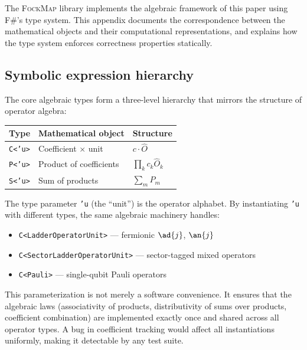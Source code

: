 %

The \textsc{FockMap} library implements the algebraic framework of this
paper using F\#'s type system.  This appendix documents the
correspondence between the mathematical objects and their
computational representations, and explains how the type system
enforces correctness properties statically.

\subsection*{Symbolic expression hierarchy}

The core algebraic types form a three-level hierarchy that mirrors the
structure of operator algebra:

\begin{center}
\begin{tabular}{@{}lll@{}}
\toprule
\textbf{Type} & \textbf{Mathematical object} & \textbf{Structure} \\
\midrule
\texttt{C<'u>} & Coefficient $\times$ unit & $c \cdot \hat{O}$ \\
\texttt{P<'u>} & Product of coefficients & $\prod_k c_k \hat{O}_k$ \\
\texttt{S<'u>} & Sum of products & $\sum_m P_m$ \\
\bottomrule
\end{tabular}
\end{center}

The type parameter \texttt{'u} (the ``unit'') is the operator alphabet.
By instantiating \texttt{'u} with different types, the same algebraic
machinery handles:

\begin{itemize}
  \item \texttt{C<LadderOperatorUnit>} --- fermionic $\ad{j}$, $\an{j}$
  \item \texttt{C<SectorLadderOperatorUnit>} --- sector-tagged mixed
    operators
  \item \texttt{C<Pauli>} --- single-qubit Pauli operators
\end{itemize}

This parameterization is not merely a software convenience.  It
ensures that the algebraic laws (associativity of products,
distributivity of sums over products, coefficient combination) are
implemented exactly once and shared across all operator types.
A bug in coefficient tracking would affect all instantiations
uniformly, making it detectable by any test suite.

